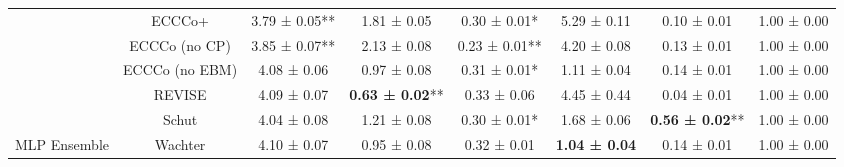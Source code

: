 \begin{table}
{\begin{tabular}[t]{cccccccc}
 & ECCCo+ & 3.79 ± 0.05** & 1.81 ± 0.05\hphantom{*}\hphantom{*} & 0.30 ± 0.01*\hphantom{*} & 5.29 ± 0.11\hphantom{*}\hphantom{*} & 0.10 ± 0.01\hphantom{*}\hphantom{*} & 1.00 ± 0.00\hphantom{*}\hphantom{*}\\

 & ECCCo (no CP) & 3.85 ± 0.07** & 2.13 ± 0.08\hphantom{*}\hphantom{*} & 0.23 ± 0.01** & 4.20 ± 0.08\hphantom{*}\hphantom{*} & 0.13 ± 0.01\hphantom{*}\hphantom{*} & 1.00 ± 0.00\hphantom{*}\hphantom{*}\\

 & ECCCo (no EBM) & 4.08 ± 0.06\hphantom{*}\hphantom{*} & 0.97 ± 0.08\hphantom{*}\hphantom{*} & 0.31 ± 0.01*\hphantom{*} & 1.11 ± 0.04\hphantom{*}\hphantom{*} & 0.14 ± 0.01\hphantom{*}\hphantom{*} & 1.00 ± 0.00\hphantom{*}\hphantom{*}\\

 & REVISE & 4.09 ± 0.07\hphantom{*}\hphantom{*} & \textbf{0.63 ± 0.02}** & 0.33 ± 0.06\hphantom{*}\hphantom{*} & 4.45 ± 0.44\hphantom{*}\hphantom{*} & 0.04 ± 0.01\hphantom{*}\hphantom{*} & 1.00 ± 0.00\hphantom{*}\hphantom{*}\\

 & Schut & 4.04 ± 0.08\hphantom{*}\hphantom{*} & 1.21 ± 0.08\hphantom{*}\hphantom{*} & 0.30 ± 0.01*\hphantom{*} & 1.68 ± 0.06\hphantom{*}\hphantom{*} & \textbf{0.56 ± 0.02}** & 1.00 ± 0.00\hphantom{*}\hphantom{*}\\

\multirow[t]{-10}{*}{\centering\arraybackslash MLP Ensemble} & Wachter & 4.10 ± 0.07\hphantom{*}\hphantom{*} & 0.95 ± 0.08\hphantom{*}\hphantom{*} & 0.32 ± 0.01\hphantom{*}\hphantom{*} & \textbf{1.04 ± 0.04}\hphantom{*}\hphantom{*} & 0.14 ± 0.01\hphantom{*}\hphantom{*} & 1.00 ± 0.00\hphantom{*}\hphantom{*}\\
\bottomrule
\end{tabular}}
\end{table}
